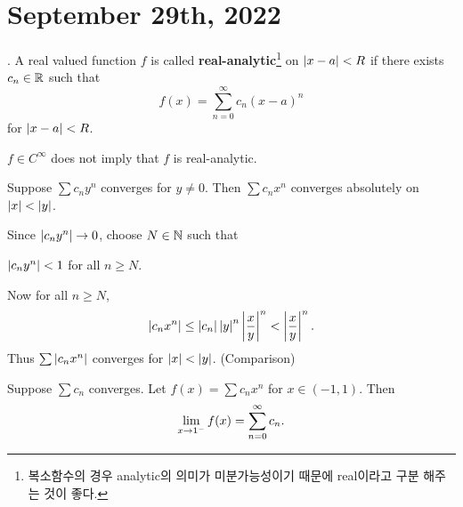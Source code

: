 \section*{September 29th, 2022}

.  A real valued function \(f\) is called \textbf{real-analytic}\footnote{복소함수의 경우 analytic의 의미가 미분가능성이기 때문에 real이라고 구분 해주는 것이 좋다.} on \(\left| x - a \right| < R\) if there exists \(c_n \in \mathbb{R}\) such that
\[
    f(x) = \sum_{n=0}^\infty c_n (x-a)^n
\]
for \(\left| x - a \right| < R\).

\rmk \(f \in C^\infty\) does not imply that \(f\) is real-analytic.

\lemma Suppose \(\sum c_n y^n\) converges for \(y \neq 0\). Then \(\sum c_n x^n\) converges absolutely on \(\left| x \right| < \left| y \right|\).

\pf Since \(\left| c_ny^n \right| \rightarrow 0\), choose \(N \in \mathbb{N}\) such that
\begin{center}
    \(\left| c_ny^n \right| < 1\) for all \(n \geq N\).
\end{center}
Now for all \(n \geq N\),
\[
    \left| c_n x^n \right| \leq \left| c_n \right|\left| y \right|^n \left| \frac{x}{y} \right|^n < \left| \frac{x}{y} \right|^n.
\]
Thus \(\sum \left| c_n x^n \right|\) converges for \(\left| x \right| < \left| y \right|\). (Comparison)

  Suppose \(\sum c_n\) converges. Let \(f(x) = \sum c_n x^n\) for \(x \in (-1, 1)\). Then
\[
    \lim_{x \rightarrow 1^-} f(x) = \sum_{n=0}^\infty c_n.
\]

